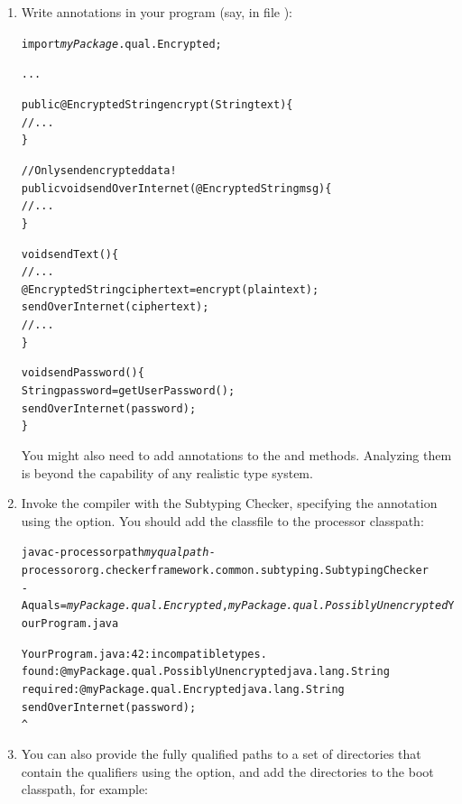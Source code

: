 \begin{enumerate}
Don't forget to compile these classes:

\begin{Verbatim}
$ javac myPackage/qual/Encrypted.java myPackage/qual/PossiblyUnencrypted.java
\end{Verbatim}

The resulting \<.class> files should be on the same path (the classpath or
processorpath) as the Checker Framework.

\item
  Write  annotations in your program (say, in file
  ):

\begin{alltt}
import \textit{myPackage}.qual.Encrypted;

...

public @Encrypted String encrypt(String text) \{
    // ...
\}

// Only send encrypted data!
public void sendOverInternet(@Encrypted String msg) \{
    // ...
\}

void sendText() \{
    // ...
    @Encrypted String ciphertext = encrypt(plaintext);
    sendOverInternet(ciphertext);
    // ...
\}

void sendPassword() \{
    String password = getUserPassword();
    sendOverInternet(password);
\}
\end{alltt}

You might also need to add  annotations to the
 and  methods.  Analyzing them is beyond the
capability of any realistic type system.

\item
  Invoke the compiler with the Subtyping Checker, specifying the
   annotation using the  option.
  You should add the  classfile to the processor classpath:

\begin{alltt}
  javac -processorpath \textit{myqualpath} -processor org.checkerframework.common.subtyping.SubtypingChecker \ttbs
        -Aquals=\textit{myPackage.qual.Encrypted},\textit{myPackage.qual.PossiblyUnencrypted} YourProgram.java

YourProgram.java:42: incompatible types.
found   : @myPackage.qual.PossiblyUnencrypted java.lang.String
required: @myPackage.qual.Encrypted java.lang.String
    sendOverInternet(password);
                     ^
\end{alltt}

\item
You can also provide the fully qualified paths to a set of directories
that contain the qualifiers using the  option, and add
the directories to the boot classpath, for example:


\end{enumerate}
